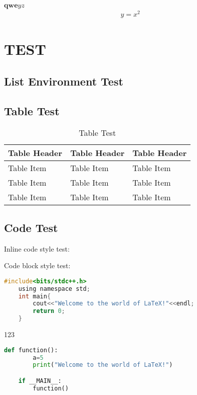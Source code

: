 \documentclass[en,blue,homework]{mdocs}
\begin{document}
\maketitle
{}
$\bm{qwe}yz$
\begin{align}
    y=x^2
\end{align}

\lipsum[1-8]
\section{TEST}
\lipsum[1-8]
\subsection{List Environment Test}
\lipsum[1]
\begin{itemlist}
    \item \lipsum[1]
    \item \lipsum[1]
    \item \lipsum[1]
\end{itemlist}

\lipsum[1]
\begin{numlist}
    \item \lipsum[1]
    \item \lipsum[1]
    \item \lipsum[1]
\end{numlist}
\subsection{Table Test}
\begin{table}[H]
    \centering
    \begin{tabular}{lll}
        \toprule
        Table Header & Table Header & Table Header\\
        \midrule
        Table Item & Table Item & Table Item\\
        Table Item & Table Item & Table Item\\
        Table Item & Table Item & Table Item\\
        \bottomrule
    \end{tabular}
    \caption{Table Test}
\end{table}
\subsection{Code Test}
Inline code style test:


Code block style test:
\begin{lstlisting}[language=C]
    #include<bits/stdc++.h>
    using namespace std;
    int main{
        cout<<"Welcome to the world of LaTeX!"<<endl;
        return 0;
    }
\end{lstlisting}
123
\begin{lstlisting}[language=Python]
    def function():
        a=5
        print("Welcome to the world of LaTeX!")

    if __MAIN__:
        function()
\end{lstlisting}
\end{document}
